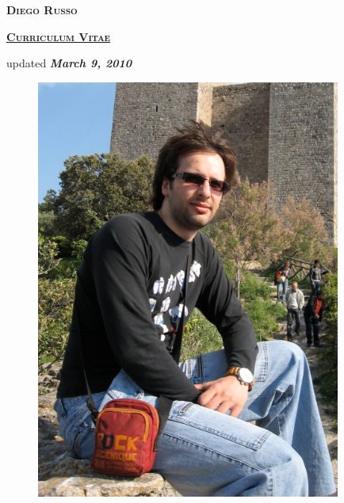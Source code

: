 \documentclass[totpages,helvetica,openbib,english]{europecv}
\begin{document}
    \begin{center}
        \hspace{1pt}
        \vspace{2cm}
    
        {\scshape \textbf{\Huge Diego Russo}}
    
        \vspace{1cm}
    
        {\scshape \textbf{\large \underline{Curriculum Vitae}}}
    
        \vspace{0.25cm}
    
        updated \emph{\textbf{March 9, 2010}}
        
        \vspace{2cm}
        
        \begin{figure}[htbp] 
            \begin{center} 
                \includegraphics[width=10cm]{io.jpg}
            \end{center} 
        \end{figure}
        
    \end{center}
\pagebreak
{}
\end{document}
